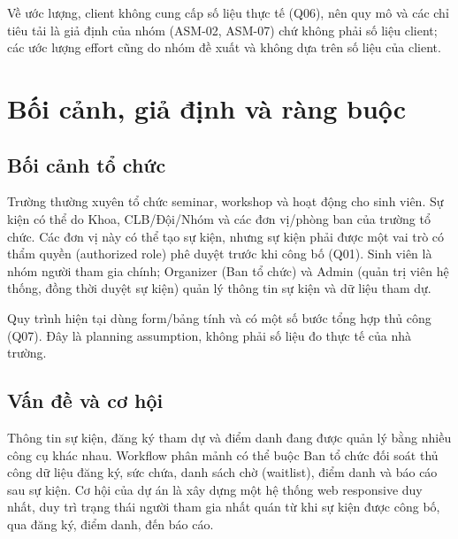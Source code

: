 Về ước lượng, client không cung cấp số liệu thực tế (Q06), nên quy mô và các chỉ tiêu tải là giả định của nhóm (ASM-02, ASM-07) chứ không phải số liệu client; các ước lượng effort cũng do nhóm đề xuất và không dựa trên số liệu của client.

\section{Bối cảnh, giả định và ràng buộc}
\label{sec:1-2}

\subsection*{Bối cảnh tổ chức}
Trường thường xuyên tổ chức seminar, workshop và hoạt động cho sinh viên. Sự kiện có thể do Khoa, CLB/Đội/Nhóm và các đơn vị/phòng ban của trường tổ chức. Các đơn vị này có thể tạo sự kiện, nhưng sự kiện phải được một vai trò có thẩm quyền (authorized role) phê duyệt trước khi công bố (Q01). Sinh viên là nhóm người tham gia chính; Organizer (Ban tổ chức) và Admin (quản trị viên hệ thống, đồng thời duyệt sự kiện) quản lý thông tin sự kiện và dữ liệu tham dự.

Quy trình hiện tại dùng form/bảng tính và có một số bước tổng hợp thủ công (Q07). Đây là planning assumption, không phải số liệu đo thực tế của nhà trường.

\subsection*{Vấn đề và cơ hội}
Thông tin sự kiện, đăng ký tham dự và điểm danh đang được quản lý bằng nhiều công cụ khác nhau. Workflow phân mảnh có thể buộc Ban tổ chức đối soát thủ công dữ liệu đăng ký, sức chứa, danh sách chờ (waitlist), điểm danh và báo cáo sau sự kiện. Cơ hội của dự án là xây dựng một hệ thống web responsive duy nhất, duy trì trạng thái người tham gia nhất quán từ khi sự kiện được công bố, qua đăng ký, điểm danh, đến báo cáo.

